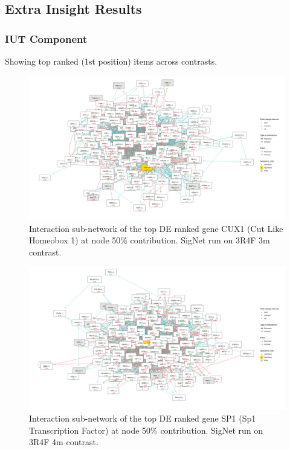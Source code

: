 \subsection{Extra Insight Results}
\label{section:suppl:results}

\subsubsection{IUT Component}
Showing top ranked (1st position) items across contrasts.
\begin{figure}[!htbp]
    \centering
    \includegraphics[width=\textwidth, height=\textheight, keepaspectratio]{Major Thesis/figures/iut/graph/3R4F3m50-CUX1.png}
    \caption{Interaction sub-network of the top DE ranked gene CUX1 (Cut Like Homeobox 1) at node 50\% contribution. SigNet run on 3R4F 3m contrast.}
\end{figure}

\begin{figure}[!htbp]
    \centering
    \includegraphics[width=\textwidth, height=\textheight, keepaspectratio]{Major Thesis/figures/iut/graph/3R4F4m50-SP1.png}
    \caption{Interaction sub-network of the top DE ranked gene SP1 (Sp1 Transcription Factor) at node 50\% contribution. SigNet run on 3R4F 4m contrast.}
\end{figure}

